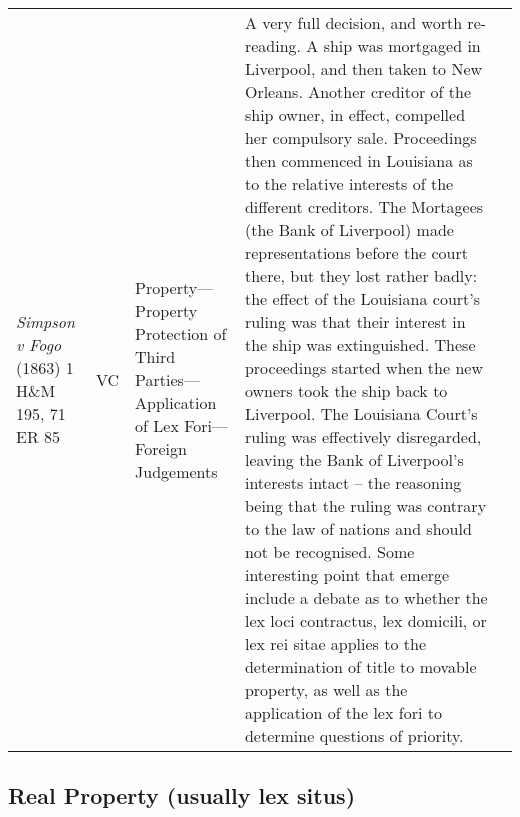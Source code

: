 \documentclass[twoside]{article}
\begin{document}
\begin{longtable}{p{4cm} p{1.7cm} p{2.5cm} p{5cm} p{2.5cm}}
\textit{Simpson v Fogo} (1863) 1 H\&M 195, 71 ER 85 & \small{VC} & \small{Property---Property Protection of Third Parties---Application of Lex Fori---Foreign Judgements} & \small{A very full decision, and worth re-reading. A ship was mortgaged in Liverpool, and then taken to New Orleans. Another creditor of the ship owner, in effect, compelled her compulsory sale. Proceedings then commenced in Louisiana as to the relative interests of the different creditors. The Mortagees (the Bank of Liverpool) made representations before the court there, but they lost rather badly: the effect of the Louisiana court’s ruling was that their interest in the ship was extinguished. These proceedings started when the new owners took the ship back to Liverpool. The Louisiana Court’s ruling was effectively disregarded, leaving the Bank of Liverpool’s interests intact – the reasoning being that the ruling was contrary to the law of nations and should not be recognised. Some interesting point that emerge include a debate as to whether the lex loci contractus, lex domicili, or lex rei sitae applies to the determination of title to movable property, as well as the application of the lex fori to determine questions of priority.} &  \\ 
\end{longtable}\subsection{Real Property (usually lex situs)}
\end{document}
